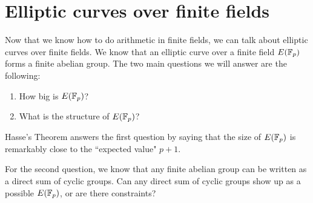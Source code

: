 \chapter{Elliptic curves over finite fields}

Now that we know how to do arithmetic in finite fields, we can talk about elliptic curves over finite fields.  We know that an elliptic curve over a finite field $E(\mathbb{F}_p)$ forms a finite abelian group.  The two main questions we will answer are the following:
\begin{enumerate}
\item
How big is $E( \mathbb{F}_p)$?
\item
What is the structure of $E( \mathbb{F}_p)$?
\end{enumerate}
Hasse's Theorem answers the first question by saying that the size of $E(\mathbb{F}_p)$ is remarkably close to the ``expected value" $p+1$.

For the second question, we know that any finite abelian group can be written as a direct sum of cyclic groups.  Can any direct sum of cyclic groups show up as a possible $E(\mathbb{F}_p)$, or are there constraints? 

